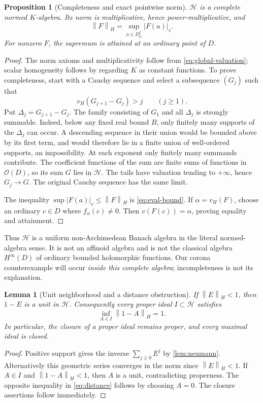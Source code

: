 \documentclass[11pt,letterpaper]{article}
\numberwithin{equation}{section}
\newtheorem{proposition}[theorem]{Proposition}
\newtheorem{lemma}[theorem]{Lemma}
\theoremstyle{definition}
\theoremstyle{remark}
\newcommand{\R}{\mathbb R}
\newcommand{\OO}{\mathcal O}
\newcommand{\HH}{\mathcal H}
\newcommand{\vH}{v_{\!H}}
\newcommand{\norm}[1]{\left\lVert#1\right\rVert}
\begin{document}
\begin{proposition}[Completeness and exact pointwise norm]
\label{prop:banach}
$\HH$ is a complete normed $K$-algebra. Its norm is multiplicative, hence
power-multiplicative, and
\begin{equation}\label{eq:supnorm}
 \norm F_H=\sup_{a\in D^\sharp_\R}|F(a)|_v.
\end{equation}
For nonzero $F$, the supremum is attained at an ordinary point of $D$.
\end{proposition}
\begin{proof}
The norm axioms and multiplicativity follow from
\eqref{eq:global-valuation}; scalar homogeneity follows by regarding
$K$ as constant functions. To prove completeness, start with a Cauchy
sequence and select a subsequence $(G_j)$ such that
\[
 \vH(G_{j+1}-G_j)>j\qquad(j\ge1).
\]
Put $\Delta_j=G_{j+1}-G_j$. The family consisting of $G_1$ and all
$\Delta_j$ is strongly summable. Indeed, below any fixed real bound
$B$, only finitely many supports of the $\Delta_j$ can occur. A descending
sequence in their union would be bounded above by its first term, and
would therefore lie in a finite union of well-ordered supports, an
impossibility. At each exponent only finitely many summands contribute.
The coefficient functions of the sum are finite sums of functions in
$\OO(D)$, so its sum $G$ lies in $\HH$. The tails have valuation tending
to $+\infty$, hence $G_j\to G$. The original Cauchy sequence has the same
limit.

The inequality $\sup|F(a)|_v\le\norm F_H$ is
\eqref{eq:eval-bound}. If $\alpha=\vH(F)$, choose an ordinary $c\in D$
where $f_\alpha(c)\ne0$. Then $v(F(c))=\alpha$, proving equality and
attainment.
\end{proof}

Thus $\HH$ is a uniform non-Archimedean Banach algebra in the literal
normed-algebra sense. It is not an affinoid algebra and is not the
classical algebra $H^\infty(D)$ of ordinary bounded holomorphic functions.
Our corona counterexample will occur \emph{inside this complete algebra};
incompleteness is not its explanation.

\begin{lemma}[Unit neighborhood and a distance obstruction]
\label{lem:distance}
If $\norm E_H<1$, then $1-E$ is a unit in $\HH$. Consequently every proper
ideal $I\subset\HH$ satisfies
\begin{equation}\label{eq:distance}
 \inf_{A\in I}\norm{1-A}_H=1.
\end{equation}
In particular, the closure of a proper ideal remains proper, and every
maximal ideal is closed.
\end{lemma}
\begin{proof}
Positive support gives the inverse $\sum_{j\ge0}E^j$ by
\cref{lem:neumann}. Alternatively this geometric series converges in the
norm since $\norm E_H<1$. If $A\in I$ and $\norm{1-A}_H<1$, then $A$ is
a unit, contradicting properness. The opposite inequality in
\eqref{eq:distance} follows by choosing $A=0$. The closure assertions
follow immediately.
\end{proof}
\end{document}
